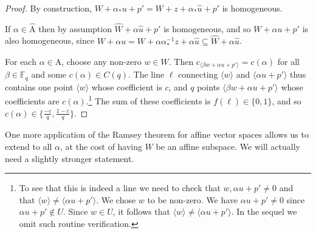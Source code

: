 \documentclass{article}
\theoremstyle{definition}
\providecommand{\Cset}{C}
\providecommand{\Alpha}{\mathrm{A}}
\providecommand{\hatAlpha}{\hat{\Alpha}}
\begin{document}
\begin{proof}
By construction, $W + \alpha_* u + p' = W + z + \alpha_* \hat u + p'$ is homogeneous.

If $\alpha \in \hatAlpha$ then by assumption $\hat{W} + \alpha \hat{u} + p'$ is homogeneous, and so $W + \alpha u + p'$ is also homogeneous, since $W + \alpha u = W + \alpha \alpha_*^{-1} z + \alpha \hat u \subseteq \hat{W} + \alpha \hat u$.

For each $\alpha \in \Alpha$, choose any non-zero $w \in W$. Then $c_{\langle \beta w + \alpha u + p' \rangle} = c(\alpha)$ for all $\beta \in \mathbb{F}_q$ and some $c(\alpha) \in \Cset(q)$. The line $\ell$ connecting $\langle w \rangle$ and $\langle \alpha u + p' \rangle$ thus contains one point $\langle w \rangle$ whose coefficient is $c$, and $q$ points $\langle \beta w + \alpha u + p' \rangle$ whose coefficients are $c(\alpha)$.\footnote{To see that this is indeed a line we need to check that $w, \alpha u + p' \neq 0$ and that $\langle w \rangle \neq \langle \alpha u + p' \rangle$. We chose $w$ to be non-zero. We have $\alpha u + p' \neq 0$ since $\alpha u + p' \notin U$. Since $w \in U$, it follows that $\langle w \rangle \neq \langle \alpha u + p' \rangle$. In the sequel we omit such routine verification.} The sum of these coefficients is $f(\ell) \in \{0,1\}$, and so $c(\alpha) \in \{\frac{-c}{q}, \frac{1-c}{q}\}$.
\end{proof}

One more application of the Ramsey theorem for affine vector spaces allows us to extend  to all $\alpha$, at the cost of having $W$ be an affine subspace. We will actually need a slightly stronger statement.
\end{document}
